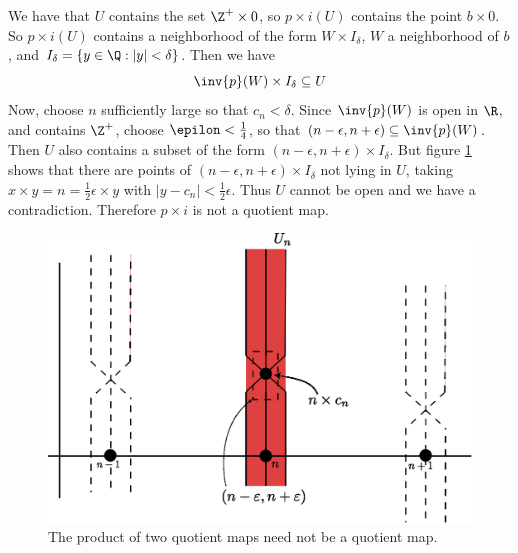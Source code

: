 \begin{example}
\begin{enumerate}
            We have that $U$ contains the set  $\Z^+ \times 0$, so $p \times
            i(U)$ contains the point $b \times 0$. So  $p \times i(U)$ contains
            a neighborhood of the form $W \times I_\delta$,  $W$ a neighborhood
            of  $b$, and  $I_\delta=\{y \in \Q : |y|<\delta\}$. Then we have
            \begin{equation*}
                \inv{p}(W) \times I_\delta \subseteq U
            \end{equation*}
            Now, choose $n$ sufficiently large so that  $c_n<\delta$. Since
            $\inv{p}(W)$ is open in $\R$, and contains $\Z^+$, choose
            $\epilon<\frac{1}{4}$, so that $(n-\epsilon,n+\epsilon) \subseteq
            \inv{p}(W)$. Then $U$ also contains a subset of the form
            $(n-\epsilon,n+\epsilon) \times I_\delta$. But figure \ref{fig_2.8}
            shows that there are points of $(n-\epsilon,n+\epsilon) \times
            I_\delta$ not lying in $U$, taking  $x \times
            y=n=\frac{1}{2}\epsilon \times y$ with
            $|y-c_n|<\frac{1}{2}\epsilon$. Thus $U$ cannot be open and we have a
            contradiction. Therefore $p \times i$ is not a quotient map.

            \begin{figure}[h]
                \centering
                \includegraphics[scale=0.5]{Figures/Chapter2/figure22_8.eps}
                \caption{The product of two quotient maps need not be a quotient
                map.}
                \label{fig_2.8}
            \end{figure}
    \end{enumerate}
\end{example}

